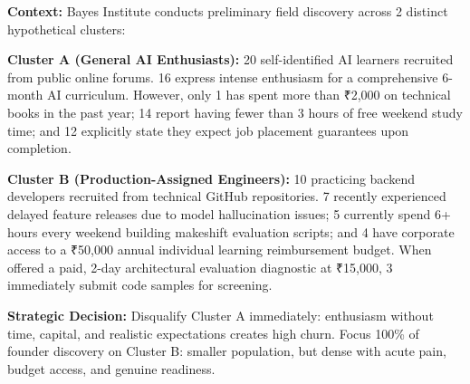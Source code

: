 \noindent\textbf{Context:} Bayes Institute conducts preliminary field discovery across 2 distinct hypothetical clusters:

\noindent\textbf{Cluster A (General AI Enthusiasts):} 20 self-identified AI learners recruited from public online forums. 16 express intense enthusiasm for a comprehensive 6-month AI curriculum. However, only 1 has spent more than ₹2,000 on technical books in the past year; 14 report having fewer than 3 hours of free weekend study time; and 12 explicitly state they expect job placement guarantees upon completion.

\noindent\textbf{Cluster B (Production-Assigned Engineers):} 10 practicing backend developers recruited from technical GitHub repositories. 7 recently experienced delayed feature releases due to model hallucination issues; 5 currently spend 6+ hours every weekend building makeshift evaluation scripts; and 4 have corporate access to a ₹50,000 annual individual learning reimbursement budget. When offered a paid, 2-day architectural evaluation diagnostic at ₹15,000, 3 immediately submit code samples for screening.

\noindent\textbf{Strategic Decision:} Disqualify Cluster A immediately: enthusiasm without time, capital, and realistic expectations creates high churn. Focus 100\% of founder discovery on Cluster B: smaller population, but dense with acute pain, budget access, and genuine readiness.
